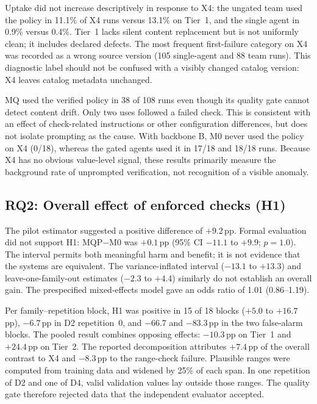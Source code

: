 \documentclass[conference]{IEEEtran}
\newcommand{\sys}[1]{\textsf{#1}}
\begin{document}
Uptake did not increase descriptively in response to X4: the ungated team used the policy in 11.1\% of X4 runs versus 13.1\% on Tier~1, and the single agent in 0.9\% versus 0.4\%. Tier~1 lacks silent content replacement but is not uniformly clean; it includes declared defects. The most frequent first-failure category on X4 was recorded as a wrong source version (105 single-agent and 88 team runs). This diagnostic label should not be confused with a visibly changed catalog version: X4 leaves catalog metadata unchanged.

\sys{MQ} used the verified policy in 38 of 108 runs even though its quality gate cannot detect content drift. Only two uses followed a failed check. This is consistent with an effect of check-related instructions or other configuration differences, but does not isolate prompting as the cause. With backbone B, \sys{M0} never used the policy on X4 (0/18), whereas the gated agents used it in 17/18 and 18/18 runs. Because X4 has no obvious value-level signal, these results primarily measure the background rate of unprompted verification, not recognition of a visible anomaly.

\subsection{RQ2: Overall effect of enforced checks (H1)}
The pilot estimator suggested a positive difference of $+9.2$\,pp. Formal evaluation did not support H1: \sys{MQP}$-$\sys{M0} was $+0.1$\,pp (95\% CI $-11.1$ to $+9.9$; $p=1.0$). The interval permits both meaningful harm and benefit; it is not evidence that the systems are equivalent. The variance-inflated interval ($-13.1$ to $+13.3$) and leave-one-family-out estimates ($-2.3$ to $+4.4$) similarly do not establish an overall gain. The prespecified mixed-effects model gave an odds ratio of 1.01 (0.86--1.19).

Per family--repetition block, H1 was positive in 15 of 18 blocks ($+5.0$ to $+16.7$\,pp), $-6.7$\,pp in D2 repetition~0, and $-66.7$ and $-83.3$\,pp in the two false-alarm blocks. The pooled result combines opposing effects: $-10.3$\,pp on Tier~1 and $+24.4$\,pp on Tier~2. The reported decomposition attributes $+7.4$\,pp of the overall contrast to X4 and $-8.3$\,pp to the range-check failure. Plausible ranges were computed from training data and widened by 25\% of each span. In one repetition of D2 and one of D4, valid validation values lay outside those ranges. The quality gate therefore rejected data that the independent evaluator accepted.
\end{document}
